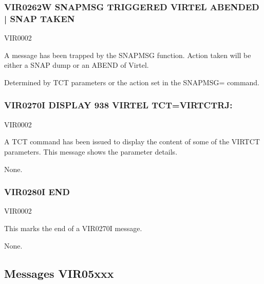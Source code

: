 \documentclass[letterpaper,10pt,english]{sphinxmanual}
\begin{document}
\subsubsection{VIR0262W SNAPMSG TRIGGERED \sphinxhyphen{} VIRTEL ABENDED | SNAP TAKEN}
\label{\detokenize{messages:vir0262w-snapmsg-triggered-virtel-abended-snap-taken}}\begin{description}
\sphinxAtStartPar
VIR0002

\sphinxAtStartPar
A message has been trapped by the SNAPMSG function. Action taken will be either a SNAP dump or an ABEND of Virtel.

\sphinxAtStartPar
Determined by TCT parameters or the action set in the SNAPMSG= command.

\end{description}


\subsubsection{VIR0270I DISPLAY 938 VIRTEL TCT=VIRTCTRJ:}
\label{\detokenize{messages:vir0270i-display-938-virtel-tct-virtctrj}}\begin{description}
\sphinxAtStartPar
VIR0002

\sphinxAtStartPar
A TCT command has been issued to display the content of some of the VIRTCT parameters. This message shows the parameter details.

\sphinxAtStartPar
None.

\end{description}


\subsubsection{VIR0280I END}
\label{\detokenize{messages:vir0280i-end}}\begin{description}
\sphinxAtStartPar
VIR0002

\sphinxAtStartPar
This marks the end of a VIR0270I message.

\sphinxAtStartPar
None.

\end{description}


\subsection{Messages VIR05xxx}
\label{\detokenize{messages:messages-vir05xxx}}
\end{document}
